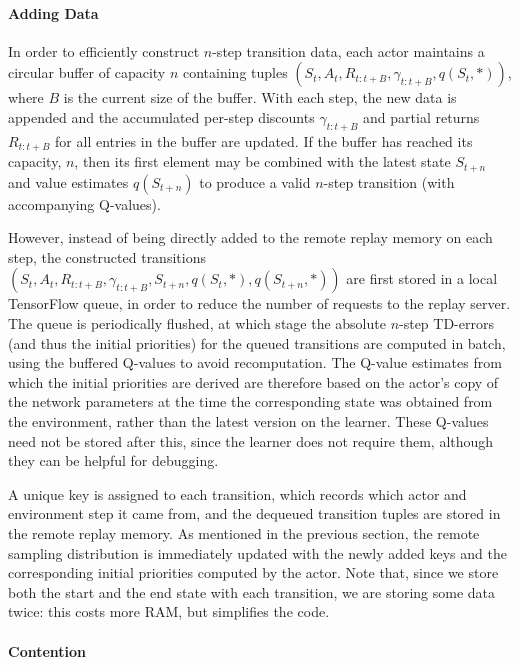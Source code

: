 \documentclass{article} %
\begin{document}
\paragraph{Adding Data}

In order to efficiently construct $n$-step transition data, each actor maintains a circular buffer of capacity $n$ containing tuples $(S_t, A_t, R_{t:t+B}, \gamma_{t:t+B}, q(S_t, *))$, where $B$ is the current size of the buffer. With each step, the new data is appended and the accumulated per-step discounts $\gamma_{t:t+B}$ and partial returns $R_{t:t+B}$ for all entries in the buffer are updated. If the buffer has reached its capacity, $n$, then its first element may be combined with the latest state $S_{t+n}$ and value estimates $q(S_{t+n})$ to produce a valid $n$-step transition (with accompanying Q-values).

However, instead of being directly added to the remote replay memory on each step, the constructed transitions $(S_t, A_t, R_{t:t+B}, \gamma_{t:t+B}, S_{t+n}, q(S_t, *), q(S_{t+n}, *))$ are first stored in a local TensorFlow queue, in order to reduce the number of requests to the replay server. The queue is periodically flushed, at which stage the absolute $n$-step TD-errors (and thus the initial priorities) for the queued transitions are computed in batch, using the buffered Q-values to avoid recomputation. The Q-value estimates from which the initial priorities are derived are therefore based on the actor's copy of the network parameters at the time the corresponding state was obtained from the environment, rather than the latest version on the learner. These Q-values need not be stored after this, since the learner does not require them, although they can be helpful for debugging.

A unique key is assigned to each transition, which records which actor and environment step it came from, and the dequeued transition tuples are stored in the remote replay memory. As mentioned in the previous section, the remote sampling distribution is immediately updated with the newly added keys and the corresponding initial priorities computed by the actor. Note that, since we store both the start and the end state with each transition, we are storing some data twice: this costs more RAM, but simplifies the code.

\paragraph{Contention}
\end{document}
